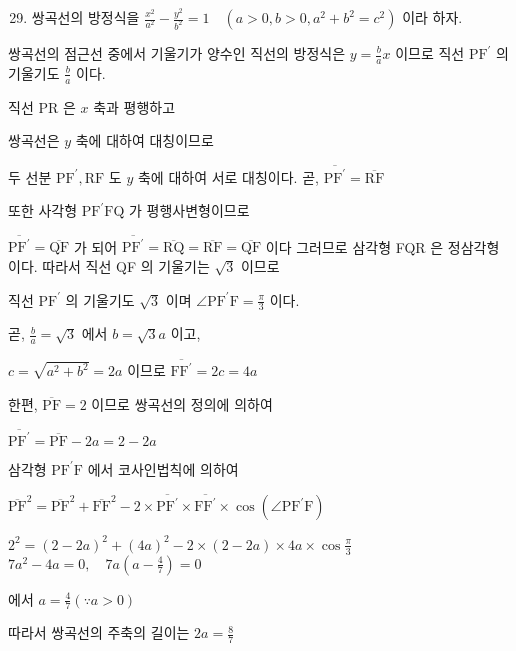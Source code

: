 \documentclass[10pt]{article}
\begin{document}
\begin{enumerate}
  \setcounter{enumi}{28}
  \item 쌍곡선의 방정식을 \(\frac{x^{2}}{a^{2}}-\frac{y^{2}}{b^{2}}=1 \quad\left(a>0, b>0, a^{2}+b^{2}=c^{2}\right)\) 이라 하자.
\end{enumerate}

쌍곡선의 점근선 중에서 기울기가 양수인 직선의 방정식은 \(y=\frac{b}{a} x\) 이므로 직선 \(\mathrm{PF}^{\prime}\) 의 기울기도 \(\frac{b}{a}\) 이다.

직선 PR 은 \(x\) 축과 평행하고

쌍곡선은 \(y\) 축에 대하여 대칭이므로

두 선분 \(\mathrm{PF}^{\prime}, \mathrm{RF}\) 도 \(y\) 축에 대하여 서로 대칭이다. 곧, \(\overline{\mathrm{PF}^{\prime}}=\overline{\mathrm{RF}}\)

또한 사각형 \(\mathrm{PF}^{\prime} \mathrm{FQ}\) 가 평행사변형이므로

\(\overline{\mathrm{PF}^{\prime}}=\overline{\mathrm{QF}}\) 가 되어 \(\overline{\mathrm{PF}^{\prime}}=\overline{\mathrm{RQ}}=\overline{\mathrm{RF}}=\overline{\mathrm{QF}}\) 이다 그러므로 삼각형 FQR 은 정삼각형이다. 따라서 직선 QF 의 기울기는 \(\sqrt{3}\) 이므로

직선 \(\mathrm{PF}^{\prime}\) 의 기울기도 \(\sqrt{3}\) 이며 \(\angle \mathrm{PF}^{\prime} \mathrm{F}=\frac{\pi}{3}\) 이다.

곧, \(\frac{b}{a}=\sqrt{3}\) 에서 \(b=\sqrt{3} a\) 이고,

\(c=\sqrt{a^{2}+b^{2}}=2 a\) 이므로 \(\overline{\mathrm{FF}^{\prime}}=2 c=4 a\)

한편, \(\overline{\mathrm{PF}}=2\) 이므로 쌍곡선의 정의에 의하여

\(\overline{\mathrm{PF}^{\prime}}=\overline{\mathrm{PF}}-2 a=2-2 a\)

삼각형 \(\mathrm{PF}^{\prime} \mathrm{F}\) 에서 코사인법칙에 의하여

\(\overline{\mathrm{PF}}^{2}=\overline{\mathrm{PF}}^{2}+\overline{\mathrm{FF}}^{2}-2 \times \overline{\mathrm{PF}^{\prime}} \times \overline{\mathrm{FF}^{\prime}} \times \cos \left(\angle \mathrm{PF}^{\prime} \mathrm{F}\right)\)

\(2^{2}=(2-2 a)^{2}+(4 a)^{2}-2 \times(2-2 a) \times 4 a \times \cos \frac{\pi}{3}\) \(7 a^{2}-4 a=0, \quad 7 a\left(a-\frac{4}{7}\right)=0\)

에서 \(a=\frac{4}{7}(\because a>0)\)

따라서 쌍곡선의 주축의 길이는 \(2 a=\frac{8}{7}\)
\end{document}
